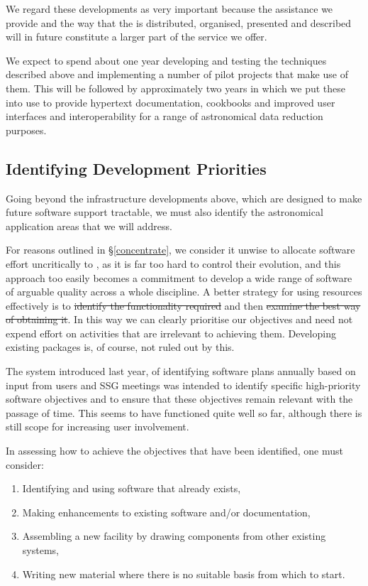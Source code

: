 We regard these developments as very important because the assistance
we provide and the way that the 
is distributed, organised, presented and described will in future
constitute a larger part of the service we offer.

We expect to spend about one year developing and testing the
techniques described above and implementing a number of pilot projects
that make use of them. This will be followed by approximately two
years in which we put these into use to provide hypertext
documentation, cookbooks and improved user interfaces and
interoperability for a range of astronomical data reduction purposes.

\subsection{\label{priority}Identifying Development Priorities}

Going beyond the infrastructure developments above, which are designed
to make future software support tractable, we must also identify the
astronomical application areas that we will address.

For reasons outlined in \S\ref{concentrate}, we consider it unwise to
allocate software effort uncritically to , as it is far too
hard to control their evolution, and this approach too easily becomes
a commitment to develop a wide range of software of arguable quality
across a whole discipline.  A better strategy for using resources
effectively is to \st{identify the functionality required} and then
\st{examine the best way of obtaining it}. In this way we can clearly
prioritise our objectives and need not expend effort on activities
that are irrelevant to achieving them. Developing existing packages
is, of course, not ruled out by this.

The system introduced last year, of identifying software plans
annually based on input from users and SSG meetings was
intended to identify specific high-priority software objectives and to
ensure that these objectives remain relevant with the passage of time.
This seems to have functioned quite well so far, although there is
still scope for increasing user involvement.

In assessing how to achieve the objectives that have been identified,
one must consider:
\begin{enumerate}
\item Identifying and using software that already exists,

\item Making enhancements to existing software and/or documentation,

\item Assembling a new facility by drawing components from other
existing systems,

\item Writing new material where there is no suitable basis from which
to start.
\end{enumerate}

